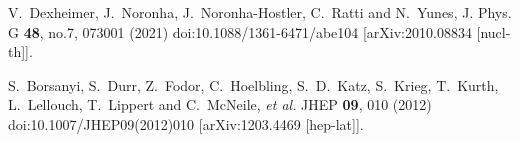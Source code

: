 \documentclass[a4paper,11pt]{article}
\begin{document}
\begin{thebibliography}{}
V.~Dexheimer, J.~Noronha, J.~Noronha-Hostler, C.~Ratti and N.~Yunes,
J. Phys. G \textbf{48}, no.7, 073001 (2021)
doi:10.1088/1361-6471/abe104
[arXiv:2010.08834 [nucl-th]].

S.~Borsanyi, S.~Durr, Z.~Fodor, C.~Hoelbling, S.~D.~Katz, S.~Krieg, T.~Kurth, L.~Lellouch, T.~Lippert and C.~McNeile, \textit{et al.}
JHEP \textbf{09}, 010 (2012)
doi:10.1007/JHEP09(2012)010
[arXiv:1203.4469 [hep-lat]].

\end{thebibliography}
\end{document}
